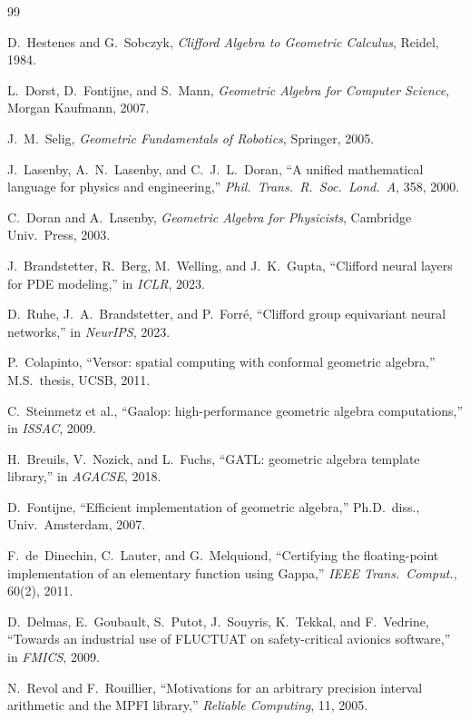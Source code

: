\documentclass[11pt,a4paper]{article}
\theoremstyle{definition}
\theoremstyle{plain}
\theoremstyle{remark}
\begin{document}
\begin{thebibliography}{99}

D.~Hestenes and G.~Sobczyk,
\emph{Clifford Algebra to Geometric Calculus}, Reidel, 1984.

L.~Dorst, D.~Fontijne, and S.~Mann,
\emph{Geometric Algebra for Computer Science}, Morgan Kaufmann, 2007.

J.~M.~Selig,
\emph{Geometric Fundamentals of Robotics}, Springer, 2005.

J.~Lasenby, A.~N.~Lasenby, and C.~J.~L.~Doran,
``A unified mathematical language for physics and engineering,''
\emph{Phil.\ Trans.\ R.\ Soc.\ Lond.\ A}, 358, 2000.

C.~Doran and A.~Lasenby,
\emph{Geometric Algebra for Physicists}, Cambridge Univ.\ Press, 2003.

J.~Brandstetter, R.~Berg, M.~Welling, and J.~K.~Gupta,
``Clifford neural layers for PDE modeling,''
in \emph{ICLR}, 2023.

D.~Ruhe, J.~A.~Brandstetter, and P.~Forr\'{e},
``Clifford group equivariant neural networks,''
in \emph{NeurIPS}, 2023.

P.~Colapinto,
``Versor: spatial computing with conformal geometric algebra,''
M.S.\ thesis, UCSB, 2011.

C.~Steinmetz et al.,
``Gaalop: high-performance geometric algebra computations,''
in \emph{ISSAC}, 2009.

H.~Breuils, V.~Nozick, and L.~Fuchs,
``GATL: geometric algebra template library,''
in \emph{AGACSE}, 2018.

D.~Fontijne,
``Efficient implementation of geometric algebra,''
Ph.D.\ diss., Univ.\ Amsterdam, 2007.

F.~de~Dinechin, C.~Lauter, and G.~Melquiond,
``Certifying the floating-point implementation of an elementary function
using Gappa,''
\emph{IEEE Trans.\ Comput.}, 60(2), 2011.

D.~Delmas, E.~Goubault, S.~Putot, J.~Souyris, K.~Tekkal, and F.~Vedrine,
``Towards an industrial use of FLUCTUAT on safety-critical avionics software,''
in \emph{FMICS}, 2009.

N.~Revol and F.~Rouillier,
``Motivations for an arbitrary precision interval arithmetic and the MPFI library,''
\emph{Reliable Computing}, 11, 2005.


\end{thebibliography}
\end{document}
